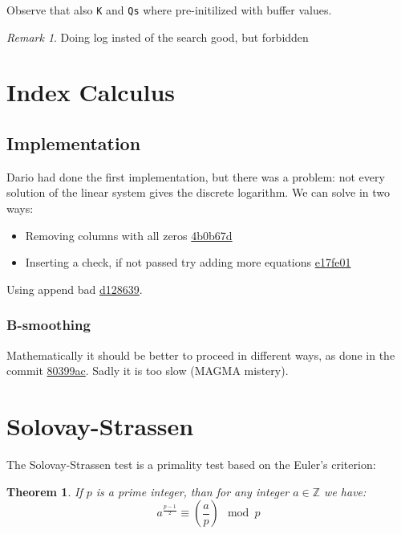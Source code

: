 \documentclass{article}
\newcommand{\ZZ}{\mathbb{Z}}
\theoremstyle{plain}
\newtheorem{teo}{Theorem}[section]
\theoremstyle{remark}
\newtheorem{rem}{Remark}
\theoremstyle{definition}
\begin{document}
Observe that also \verb|K| and \verb|Qs| where pre-initilized with buffer values. 

\begin{rem} %
	Doing log insted of the search good, but forbidden
\end{rem}


\section{Index Calculus}

\subsection{Implementation}

Dario had done the first implementation, but there was a problem: not every solution of the linear system gives the discrete logarithm. We can solve in two ways:
\begin{itemize}
	\item Removing columns with all zeros \href{https://github.com/giacomoborin/project2_MAGMA/pull/30/commits/4b0b67d0dcbe51f01058c64a06a1c39fdb5cf56e}{4b0b67d}
	\item Inserting a check, if not passed try adding more equations \href{https://github.com/giacomoborin/project2_MAGMA/pull/30/commits/e17fe016088c6746c46d52d7154922060f8e5366}{e17fe01}
\end{itemize}



Using append bad \href{https://github.com/giacomoborin/project2_MAGMA/commit/d12863968fe66504486fa7fea78929ab2aa98f43}{d128639}. 

\subsubsection{B-smoothing}

Mathematically it should be better to proceed in different ways, as done in the commit \href{https://github.com/giacomoborin/project2_MAGMA/commit/80399ac928cf19e009451f174adc4138283580f2}{80399ac}. Sadly it is too slow (MAGMA mistery).



\section{Solovay-Strassen}

The Solovay-Strassen test is a primality test based on the Euler's criterion:
\begin{teo}\label{teo:eu_quad}
	If $p$ is a prime integer, than for any integer $a \in \ZZ$ we have:
	\[ a^{\frac{p-1}{2}} \equiv \left(\dfrac{a}{p}\right) \mod p \]
\end{teo}
\end{document}
